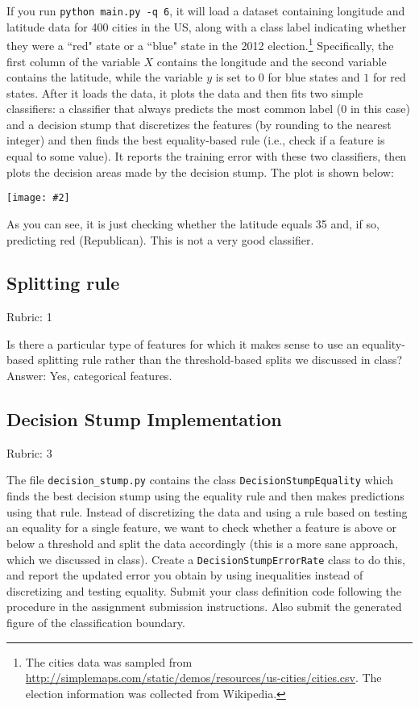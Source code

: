 \documentclass{article}
\newcommand{\ans}[1]{\green{Answer: #1}}
\newcommand{\rubric}[1]{\green{Rubric: #1}}
\newcommand{\blue}[1]{{\color{blue}#1}}
\newcommand{\green}[1]{{\color{green}#1}}
\newcommand{\centerfig}[2]{\begin{center}\texttt{[image: \#2]}\end{center}}
\begin{document}
    If you run \texttt{python main.py -q 6}, it will load a dataset containing longitude
    and latitude data for 400 cities in the US, along with a class label indicating
    whether they were a ``red" state or a ``blue" state in the 2012
    election.\footnote{The cities data was sampled from \url{http://simplemaps.com/static/demos/resources/us-cities/cities.csv}. The election information was collected from Wikipedia.}
    Specifically, the first column of the variable $X$ contains the
    longitude and the second variable contains the latitude,
    while the variable $y$ is set to $0$ for blue states and $1$ for red states.
    After it loads the data, it plots the data and then fits two simple
    classifiers: a classifier that always predicts the
    most common label ($0$ in this case) and a decision stump
    that discretizes the features (by rounding to the nearest integer)
    and then finds the best equality-based rule (i.e., check
    if a feature is equal to some value).
    It reports the training error with these two classifiers, then plots the decision areas made by the decision stump.
    The plot is shown below:

    \centerfig{0.7}{../figs/q6_decisionBoundary}

    As you can see, it is just checking whether the latitude equals 35 and, if so, predicting red (Republican).
    This is not a very good classifier.

    \subsection{Splitting rule}
    \rubric{1}

    Is there a particular type of features for which it makes sense to use an equality-based splitting rule rather than the threshold-based splits we discussed in class? \ans{Yes, categorical features.}


    \subsection{Decision Stump Implementation}
    \rubric{3}

    The file \texttt{decision\string_stump.py} contains the class \texttt{DecisionStumpEquality} which
    finds the best decision stump using the equality rule and then makes predictions using that
    rule. Instead of discretizing the data and using a rule based on testing an equality for
    a single feature, we want to check whether a feature is above or below a threshold and
    split the data accordingly (this is a more sane approach, which we discussed in class).
    \blue{Create a \texttt{DecisionStumpErrorRate} class to do this, and report the updated error you
        obtain by using inequalities instead of discretizing and testing equality.
        Submit your class definition code following the procedure in the assignment submission instructions.
        Also submit the generated figure of the classification boundary.}
\end{document}
